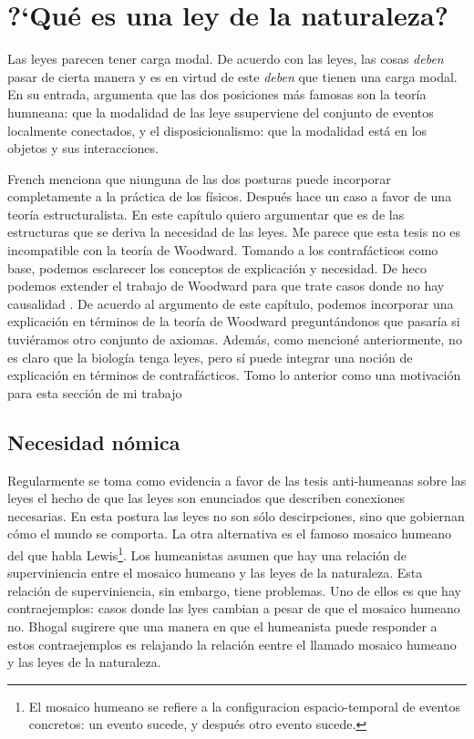 \chapter{?`Qué es una ley de la naturaleza?}

\noindent Las leyes parecen tener carga modal. De acuerdo con las leyes, las cosas \emph{deben} pasar de cierta manera y es en virtud de este \emph{deben} que tienen una carga modal. En su entrada, \cite{French2021} argumenta que las dos posiciones más famosas son la teoría humneana: que la modalidad de las leye ssuperviene del conjunto de eventos localmente conectados, y el disposicionalismo: que la modalidad está en los objetos y sus interacciones.

French menciona que niunguna de las dos posturas puede incorporar completamente a la práctica de los físicos. Después hace un caso a favor de una teoría estructuralista. En este capítulo quiero argumentar que es de las estructuras que se deriva la necesidad de las leyes. Me parece que esta tesis no es incompatible con la teoría de Woodward. Tomando a los contrafácticos como base, podemos esclarecer los conceptos de explicación y necesidad. De heco podemos extender el trabajo de Woodward para que trate casos donde no hay causalidad \cite{Woodward2018}. De acuerdo al argumento de este capítulo, podemos incorporar una explicación en términos de la teoría de Woodward preguntándonos que pasaría si tuviéramos otro conjunto de axiomas. Además, como mencioné anteriormente, no es claro que la biología tenga leyes, pero sí puede integrar una noción de explicación en términos de contrafácticos. Tomo lo anterior como una motivación para esta sección de mi trabajo

\section{Necesidad nómica}

\noindent Regularmente se toma como evidencia a favor de las tesis anti-humeanas sobre las leyes el hecho de que las leyes son enunciados que describen conexiones necesarias. En esta postura las leyes no son sólo descirpciones, sino que gobiernan cómo el mundo se comporta\cite{Bhogal2020}. La otra alternativa es el famoso mosaico humeano del que habla Lewis\footnote{El mosaico humeano se refiere a la configuracion espacio-temporal de eventos concretos: un evento sucede, y después otro evento sucede.}. Los humeanistas asumen que hay una relación de superviniencia entre el mosaico humeano y las leyes de la naturaleza. Esta relación de superviniencia, sin embargo, tiene problemas. Uno de ellos es que hay contraejemplos: casos donde las lyes cambian a pesar de que el mosaico humeano no. Bhogal sugirere que una manera en que el humeanista puede responder a estos contraejemplos es relajando la relación eentre el llamado mosaico humeano y las leyes de la naturaleza.

